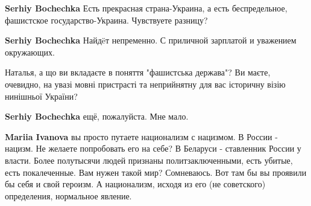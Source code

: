 \begin{itemize}
\begin{itemize}
 
\textbf{Serhiy Bochechka}
Есть прекрасная страна-Украина, а есть беспредельное, фашистское государство-Украина.
Чувствуете разницу?

 
\textbf{Serhiy Bochechka}
Найдëт непременно.
С приличной зарплатой и уважением окружающих.

 
Наталья, а що ви вкладаєте в поняття "фашистська держава"? Ви маєте, очевидно, на увазі мовні пристрасті та неприйнятну для вас історичну візію нинішньої України?

 
\textbf{Serhiy Bochechka} ещё, пожалуйста. Мне мало.

 
\textbf{Mariia Ivanova} вы просто путаете национализм с нацизмом. В России - нацизм. Не желаете попробовать его на себе? В Беларуси - ставленник России у власти. Более полутысячи людей признаны политзаключенными, есть убитые, есть покалеченные. Вам нужен такой мир? Сомневаюсь. Вот там бы вы проявили бы себя и свой героизм. А национализм, исходя из его (не советского) определения, нормальное явление.

 

\end{itemize}
\end{itemize}

